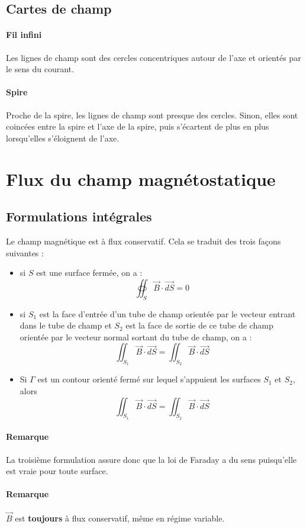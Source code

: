 \documentclass[french]{book}
\theoremstyle{plain}
\theoremstyle{definition}
\theoremstyle{remark}
\begin{document}
\subsection{Cartes de champ}
\paragraph{Fil infini} Les lignes de champ sont des cercles concentriques autour de l'axe et orientés par le sens du courant.
\paragraph{Spire} Proche de la spire, les lignes de champ sont presque des cercles. Sinon, elles sont coincées entre la spire et l'axe de la spire, puis s'écartent de plus en plus lorsqu'elles s'éloignent de l'axe.
\section{Flux du champ magnétostatique}
\subsection{Formulations intégrales}
Le champ magnétique est à flux conservatif. Cela se traduit des trois façons suivantes :
\begin{itemize}
	\item si $S$ est une surface fermée, on a : $$\oiint_S\overrightarrow{B}\cdot\overrightarrow{dS}=0$$
	\item si $S_1$ est la face d'entrée d'un tube de champ orientée par le vecteur entrant dans le tube de champ et $S_2$ est la face de sortie de ce tube de champ orientée par le vecteur normal sortant du tube de champ, on a : $$\iint_{S_1}\overrightarrow{B}\cdot\overrightarrow{dS}=\iint_{S_2}\overrightarrow{B}\cdot\overrightarrow{dS}$$
	\item Si $\Gamma$ est un contour orienté fermé sur lequel s'appuient les surfaces $S_1$ et $S_2$, alors $$\iint_{S_1}\overrightarrow{B}\cdot\overrightarrow{dS}=\iint_{S_2}\overrightarrow{B}\cdot\overrightarrow{dS}$$
\end{itemize}
\paragraph{Remarque} La troisième formulation assure donc que la loi de Faraday a du sens puisqu'elle est vraie pour toute surface.
\paragraph{Remarque} $\overrightarrow{B}$ est \textbf{toujours} à flux conservatif, même en régime variable.
\end{document}
